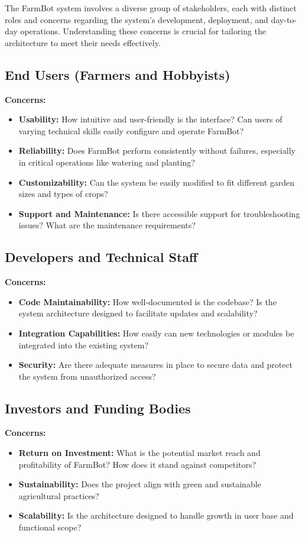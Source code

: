 The FarmBot system involves a diverse group of stakeholders, each with distinct roles and concerns regarding the system's development, deployment, and day-to-day operations. Understanding these concerns is crucial for tailoring the architecture to meet their needs effectively.

\subsection{End Users (Farmers and Hobbyists)}
\textbf{Concerns:}
\begin{itemize}
    \item \textbf{Usability:} How intuitive and user-friendly is the interface? Can users of varying technical skills easily configure and operate FarmBot?
    \item \textbf{Reliability:} Does FarmBot perform consistently without failures, especially in critical operations like watering and planting?
    \item \textbf{Customizability:} Can the system be easily modified to fit different garden sizes and types of crops?
    \item \textbf{Support and Maintenance:} Is there accessible support for troubleshooting issues? What are the maintenance requirements?
\end{itemize}

\subsection{Developers and Technical Staff}
\textbf{Concerns:}
\begin{itemize}
    \item \textbf{Code Maintainability:} How well-documented is the codebase? Is the system architecture designed to facilitate updates and scalability?
    \item \textbf{Integration Capabilities:} How easily can new technologies or modules be integrated into the existing system?
    \item \textbf{Security:} Are there adequate measures in place to secure data and protect the system from unauthorized access?
\end{itemize}

\subsection{Investors and Funding Bodies}
\textbf{Concerns:}
\begin{itemize}
    \item \textbf{Return on Investment:} What is the potential market reach and profitability of FarmBot? How does it stand against competitors?
    \item \textbf{Sustainability:} Does the project align with green and sustainable agricultural practices?
    \item \textbf{Scalability:} Is the architecture designed to handle growth in user base and functional scope?
\end{itemize}

